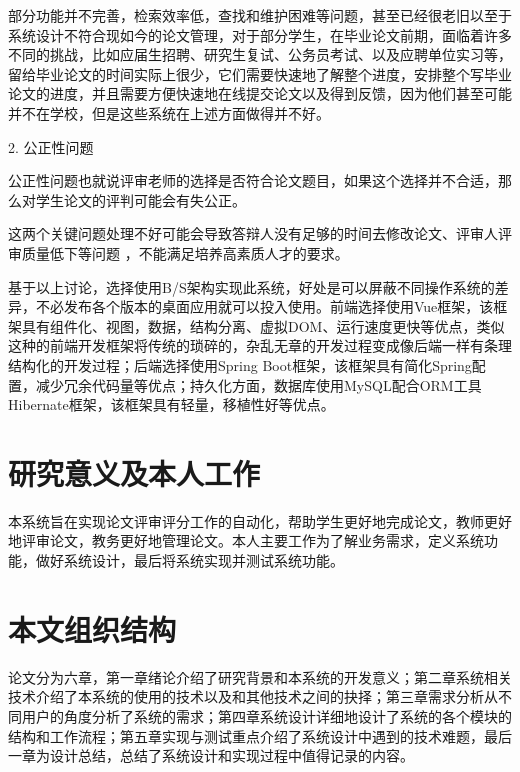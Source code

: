部分功能并不完善，检索效率低，查找和维护困难等问题，甚至已经很老旧以至于系统设计不符合现如今的论文管理，对于部分学生，在毕业论文前期，面临着许多不同的挑战，比如应届生招聘、研究生复试、公务员考试、以及应聘单位实习等，留给毕业论文的时间实际上很少\cite{.2019c}，它们需要快速地了解整个进度，安排整个写毕业论文的进度，并且需要方便快速地在线提交论文以及得到反馈，因为他们甚至可能并不在学校，但是这些系统在上述方面做得并不好。

2. 公正性问题

公正性问题也就说评审老师的选择是否符合论文题目，如果这个选择并不合适，那么对学生论文的评判可能会有失公正\cite{Setiyani.2020}。

这两个关键问题处理不好可能会导致答辩人没有足够的时间去修改论文、评审人评审质量低下等问题 ，不能满足培养高素质人才的要求\cite{.2019d}。

基于以上讨论，选择使用B/S架构实现此系统，好处是可以屏蔽不同操作系统的差异，不必发布各个版本的桌面应用就可以投入使用。前端选择使用Vue框架，该框架具有组件化、视图，数据，结构分离、虚拟DOM、运行速度更快等优点，类似这种的前端开发框架将传统的琐碎的，杂乱无章的开发过程变成像后端一样有条理结构化的开发过程；后端选择使用Spring Boot框架，该框架具有简化Spring配置，减少冗余代码量等优点；持久化方面，数据库使用MySQL配合ORM工具Hibernate框架，该框架具有轻量，移植性好等优点。

\section{研究意义及本人工作}

本系统旨在实现论文评审评分工作的自动化，帮助学生更好地完成论文，教师更好地评审论文，教务更好地管理论文。本人主要工作为了解业务需求，定义系统功能，做好系统设计，最后将系统实现并测试系统功能。

\section{本文组织结构}

论文分为六章，第一章绪论介绍了研究背景和本系统的开发意义；第二章系统相关技术介绍了本系统的使用的技术以及和其他技术之间的抉择；第三章需求分析从不同用户的角度分析了系统的需求；第四章系统设计详细地设计了系统的各个模块的结构和工作流程；第五章实现与测试重点介绍了系统设计中遇到的技术难题，最后一章为设计总结，总结了系统设计和实现过程中值得记录的内容。
